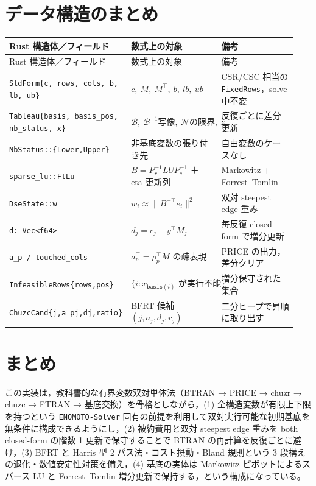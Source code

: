 \documentclass[11pt,a4paper]{ltjsarticle}
\newcommand{\code}[1]{\texttt{#1}}
\begin{document}
\section{データ構造のまとめ}

\begin{longtable}{@{}p{0.28\linewidth}p{0.34\linewidth}p{0.32\linewidth}@{}}
\toprule
Rust 構造体／フィールド & 数式上の対象 & 備考 \\
\midrule
\endfirsthead
\toprule
Rust 構造体／フィールド & 数式上の対象 & 備考 \\
\midrule
\endhead
\code{StdForm\{c, rows, cols, b, lb, ub\}} & $c,\ M,\ M^\top,\ b,\ lb,\ ub$ & CSR/CSC 相当の \code{FixedRows}，solve 中不変 \\
\code{Tableau\{basis, basis\_pos, nb\_status, x\}} & $\mathcal B,\ \mathcal B^{-1}\text{写像},\ \mathcal N\text{の限界},\ z$ & 反復ごとに差分更新 \\
\code{NbStatus::\{Lower,Upper\}} & 非基底変数の張り付き先 & 自由変数のケースなし \\
\code{sparse\_lu::FtLu} & $B = P_r^{-1}LU P_c^{-1}$ ＋ eta 更新列 & Markowitz + Forrest--Tomlin \\
\code{DseState::w} & $w_i \approx \lVert B^{-\top}e_i\rVert^2$ & 双対 steepest edge 重み \\
\code{d: Vec<f64>} & $d_j = c_j - y^\top M_j$ & 毎反復 closed form で増分更新 \\
\code{a\_p / touched\_cols} & $a_p^\top = \rho_p^\top M$ の疎表現 & PRICE の出力，差分クリア \\
\code{InfeasibleRows\{rows,pos\}} & $\{i : x_{\code{basis}(i)}\text{ が実行不能}\}$ & 増分保守された集合 \\
\code{ChuzcCand\{j,a\_pj,dj,ratio\}} & BFRT 候補 $(j, a_j, d_j, r_j)$ & 二分ヒープで昇順に取り出す \\
\bottomrule
\end{longtable}

\section{まとめ}

この実装は，教科書的な有界変数双対単体法（BTRAN → PRICE → chuzr → chuzc → FTRAN → 基底交換）を骨格としながら，(1) 全構造変数が有限上下限を持つという \code{ENOMOTO-Solver} 固有の前提を利用して双対実行可能な初期基底を無条件に構成できるようにし，(2) 被約費用と双対 steepest edge 重みを both closed-form の階数 1 更新で保守することで BTRAN の再計算を反復ごとに避け，(3) BFRT と Harris 型 2 パス法・コスト摂動・Bland 規則という 3 段構えの退化・数値安定性対策を備え，(4) 基底の実体は Markowitz ピボットによるスパース LU と Forrest--Tomlin 増分更新で保持する，という構成になっている。
\end{document}
